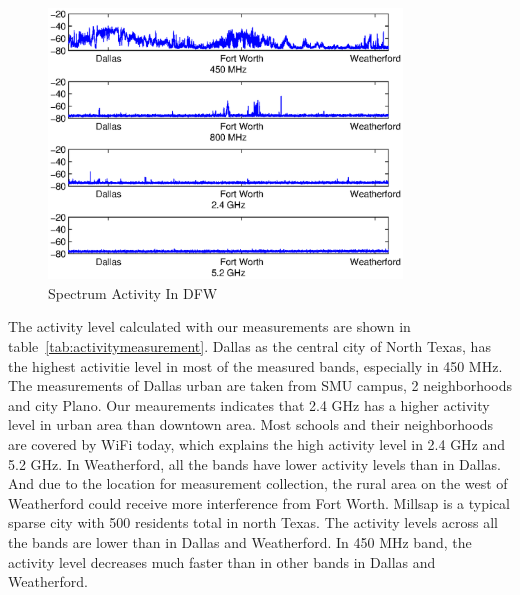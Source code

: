 \begin{figure}
\centering
\includegraphics[width=94mm]{figures/drivetest}
\vspace{-0.1in}
\caption{Spectrum Activity In DFW}                                                                 
\label{fig:drivetest}
\vspace{-0.1in}
\end{figure}

The activity level calculated with our measurements are shown in table~\ref{tab:activitymeasurement}.
Dallas as the central city of North Texas, has the highest activitie level in most of the measured bands,
especially in 450 MHz. The measurements of Dallas urban are taken from SMU campus, 2 neighborhoods
and city Plano. Our meaurements indicates that 2.4 GHz has a higher activity level in urban area than 
downtown area. Most schools and their neighborhoods are covered by WiFi today,
which explains the high activity level in 2.4 GHz and 5.2 GHz.
In Weatherford, all the bands have lower activity levels than in Dallas. And due to the location for 
measurement collection, the rural area on the west of Weatherford could receive more 
interference from Fort Worth.
Millsap is a typical sparse city with 500 residents total in north Texas. The activity levels across 
all the bands are lower than in Dallas and Weatherford. In 450 MHz band, the activity level decreases 
much faster than in other bands in Dallas and Weatherford. 



